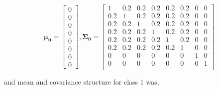 \documentclass[AMA,STIX1COL,]{WileyNJD-v2}
\begin{document}
\begin{equation*}
\pmb{\mu_0} = \begin{bmatrix}
 0 \\ 0 \\ 0\\ 0 \\ 0 \\ 0 \\ 0 \\ 0
\end{bmatrix}, \pmb{\Sigma_0} = \begin{bmatrix}
1   & 0.2 & 0.2 & 0.2 & 0.2 & 0.2 & 0 & 0\\
0.2 & 1   & 0.2 & 0.2 & 0.2 & 0.2 & 0 & 0\\
0.2 & 0.2 & 1   & 0.2 & 0.2 & 0.2 & 0 & 0\\
0.2 & 0.2 & 0.2   & 1 & 0.2 & 0.2 & 0 & 0\\
0.2 & 0.2 & 0.2   & 0.2 & 1 & 0.2 & 0 & 0\\
0.2 & 0.2 & 0.2   & 0.2 & 0.2 & 1 & 0 & 0\\
0   & 0   & 0     &  0 & 0    & 0 & 1 & 0\\
0   & 0   & 0     &  0 & 0    & 0 & 0 & 1\\
\end{bmatrix}
\end{equation*}

\hfill\break
\hfill\break
and mean and covariance structure for class 1 was,\\
\end{document}
